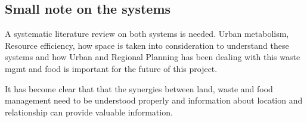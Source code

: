 \subsection{Small note on the systems}
A systematic literature review on both systems is needed. Urban metabolism, Resource efficiency, how space is taken into consideration to understand these systems and how Urban and Regional Planning has been dealing with this waste mgmt and food is important for the future of this project. \par

It has become clear that that the synergies between land, waste and food management need to be understood properly and information about location and relationship can provide valuable information.  


